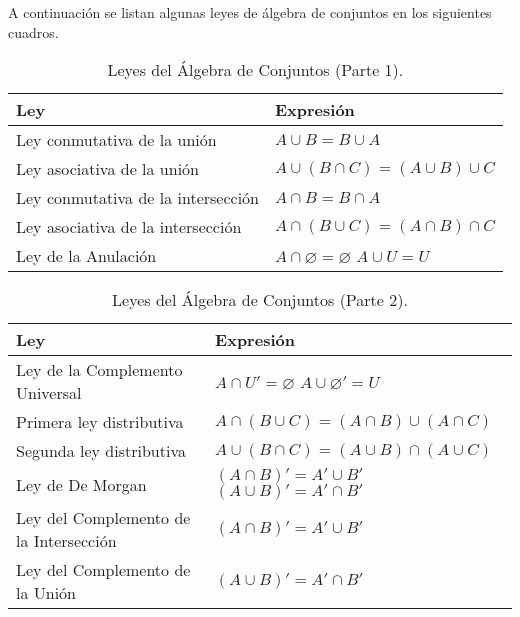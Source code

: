 \noindent  A continuaci\'on se listan algunas leyes de \'algebra de conjuntos en los siguientes cuadros.\\

\begin{table}[ht]
    \centering
    \renewcommand{\arraystretch}{1.5} %
    \begin{tabular}{|p{6cm}|p{5cm}|}
        \hline
        \textbf{Ley} & \textbf{Expresión} \\
        \hline
        Ley conmutativa de la unión  & $A \cup B =  B \cup A$ \\
        \hline
       Ley asociativa de la unión &  $A \cup (B \cap C) = (A \cup B)  \cup C$ \\
        \hline
        Ley conmutativa de la intersección & $A \cap B =  B \cap A$ \\
        \hline
        Ley asociativa de la intersección & $A \cap (B \cup C) = (A \cap B) \cap C$ \\
        \hline
        Ley de la Anulación & $A \cap \varnothing = \varnothing$ \hspace{1cm}  $A \cup U = U$ \\
        \hline
        
        
    \end{tabular}
    \caption{Leyes del Álgebra de Conjuntos (Parte 1).}
\end{table}

\begin{table}[ht]
        \centering
        \renewcommand{\arraystretch}{1.5} %
        \begin{tabular}{|p{6cm}|p{5cm}|}
            \hline
            \textbf{Ley} & \textbf{Expresión} \\
            \hline
            Ley de la Complemento Universal & $A \cap U' = \varnothing$ \hspace{1cm} $A \cup \varnothing' = U$ \\
            \hline
            Primera ley distributiva & $A \cap (B \cup C) = (A \cap B) \cup (A \cap C)$ \\
            \hline

             Segunda ley distributiva &  $A \cup (B \cap C) = (A \cup B) \cap (A \cup C)$ \\
            \hline
            
            Ley de De Morgan & $(A \cap B)' = A' \cup B'$ \newline$(A \cup B)' = A' \cap B'$ \\
            \hline
            Ley del Complemento de la Intersección & $(A \cap B)' = A' \cup B'$ \\
            \hline
            Ley del Complemento de la Unión & $(A \cup B)' = A' \cap B'$ \\
            \hline
        \end{tabular}
        \caption{Leyes del Álgebra de Conjuntos (Parte 2).}
        \label{tabla:leyes-conjuntos}
    \end{table}